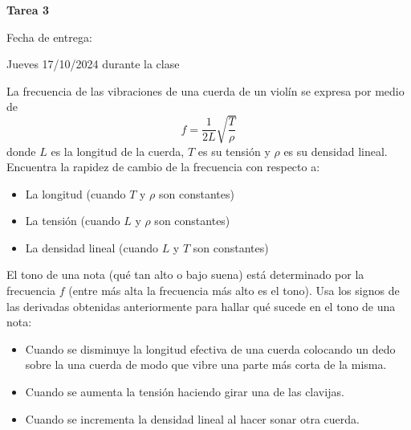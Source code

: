 \documentclass[10pt]{exam}
\begin{document}
\centering


\Large 
\textbf{Tarea 3}

\normalsize
Fecha de entrega: 

Jueves 17/10/2024 durante la clase




\pointformat{\bfseries\boldmath(\thepoints)}
\vskip10pt

\begin{questions}
    

    \question La frecuencia de las vibraciones de una cuerda de un violín se expresa por medio de
$$f=\frac{1}{2L}\sqrt{\frac{T}{\rho}}$$
donde $L$ es la longitud de la cuerda, $T$ es su tensión y $\rho$ es su densidad lineal. Encuentra la rapidez de cambio de la frecuencia con respecto a:
\begin{itemize}
    \item La longitud (cuando $T$ y $\rho$ son constantes)
    \item La tensión (cuando $L$ y $\rho$ son constantes)
    \item La densidad lineal (cuando $L$ y $T$ son constantes)
\end{itemize}{}

El tono de una nota (qué tan alto o bajo suena) está determinado por la frecuencia $f$ (entre más alta la frecuencia más alto es el tono). Usa los signos de las derivadas obtenidas anteriormente para hallar qué sucede en el tono de una nota:
\begin{itemize}
    \item Cuando se disminuye la longitud efectiva de una cuerda colocando un dedo sobre la una cuerda de modo
que vibre una parte más corta de la misma.
    \item Cuando se aumenta la tensión haciendo girar una de las clavijas.
    \item Cuando se incrementa la densidad lineal al hacer sonar otra cuerda.
\end{itemize}{}


\end{questions}
\end{document}
